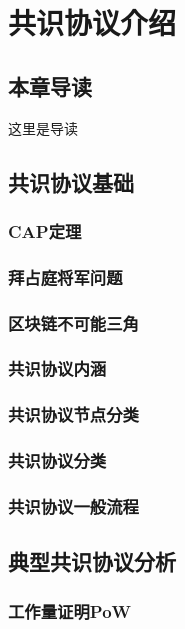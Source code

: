 \chapter{共识协议介绍}

\section{本章导读}

这里是导读

\section{共识协议基础}

\subsection{CAP定理}

\subsection{拜占庭将军问题}

\subsection{区块链不可能三角}

\subsection{共识协议内涵}

\subsection{共识协议节点分类}

\subsection{共识协议分类}

\subsection{共识协议一般流程}

\section{典型共识协议分析}

\subsection{工作量证明PoW}

